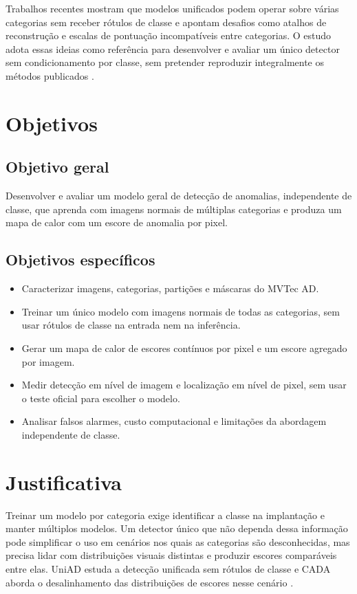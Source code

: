 \documentclass[conference]{IEEEtran}
\begin{document}
Trabalhos recentes mostram que modelos unificados podem operar sobre várias categorias sem receber rótulos de classe e apontam desafios como atalhos de reconstrução e escalas de pontuação incompatíveis entre categorias. O estudo adota essas ideias como referência para desenvolver e avaliar um único detector sem condicionamento por classe, sem pretender reproduzir integralmente os métodos publicados \cite{you2022unified,guo2024cada}.

\section{Objetivos}
\subsection{Objetivo geral}
Desenvolver e avaliar um modelo geral de detecção de anomalias, independente de classe, que aprenda com imagens normais de múltiplas categorias e produza um mapa de calor com um escore de anomalia por pixel.

\subsection{Objetivos específicos}
\begin{itemize}
\item Caracterizar imagens, categorias, partições e máscaras do MVTec AD.
\item Treinar um único modelo com imagens normais de todas as categorias, sem usar rótulos de classe na entrada nem na inferência.
\item Gerar um mapa de calor de escores contínuos por pixel e um escore agregado por imagem.
\item Medir detecção em nível de imagem e localização em nível de pixel, sem usar o teste oficial para escolher o modelo.
\item Analisar falsos alarmes, custo computacional e limitações da abordagem independente de classe.
\end{itemize}

\section{Justificativa}
Treinar um modelo por categoria exige identificar a classe na implantação e manter múltiplos modelos. Um detector único que não dependa dessa informação pode simplificar o uso em cenários nos quais as categorias são desconhecidas, mas precisa lidar com distribuições visuais distintas e produzir escores comparáveis entre elas. UniAD estuda a detecção unificada sem rótulos de classe e CADA aborda o desalinhamento das distribuições de escores nesse cenário \cite{you2022unified,guo2024cada}.
\end{document}
